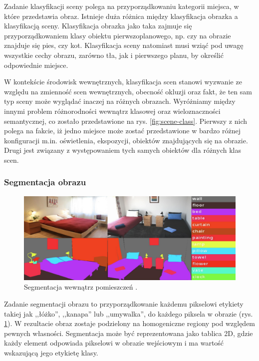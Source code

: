 Zadanie klasyfikacji sceny polega na przyporządkowaniu kategorii miejsca, w które przedstawia obraz. Istnieje duża różnica między klasyfikacja obrazka a klasyfikacją sceny. Klasyfikacja obrazka jako taka zajmuje się przyporządkowaniem klasy obiektu pierwszoplanowego, np. czy na obrazie znajduje się pies, czy kot. Klasyfikacja sceny natomiast musi wziąć pod uwagę wszystkie cechy obrazu, zarówno tła, jak i pierwszego planu, by określić odpowiednie miejsce. 

W kontekście środowisk wewnętrznych, klasyfikacja scen stanowi wyzwanie ze względu na zmienność scen wewnętrznych, obecność okluzji oraz fakt, że ten sam typ sceny może wyglądać inaczej na różnych obrazach. Wyróżniamy między innymi problem różnorodności wewnątrz klasowej oraz wieloznaczności semantycznej, co zostało przedstawione na rys. \ref{fig:scene-class}. Pierwszy z nich polega na fakcie, iż jedno miejsce może zostać przedstawione w bardzo różnej konfiguracji m.in. oświetlenia, ekspozycji, obiektów znajdujących się na obrazie. Drugi jest związany z występowaniem tych samych obiektów dla różnych klas scen.

\subsubsection{Segmentacja obrazu}
\begin{figure}[ht!]
    \includegraphics[width=\textwidth]{img/segment.png}
    \caption{Segmentacja wewnątrz pomieszczeń \cite{zhang2018context}.}
    \label{fig:segment}
  \end{figure}
  
Zadanie segmentacji obrazu to przyporządkowanie każdemu pikselowi etykiety takiej jak ,,łóżko'', ,,kanapa'' lub ,,umywalka'', do każdego piksela w obrazie (rys. \ref{fig:segment}). W rezultacie obraz zostaje podzielony na homogeniczne regiony pod względem pewnych własności. Segmentacja może być reprezentowana jako tablica 2D, gdzie każdy element odpowiada pikselowi w obrazie wejściowym i ma wartość wskazującą jego etykietę klasy.
  
